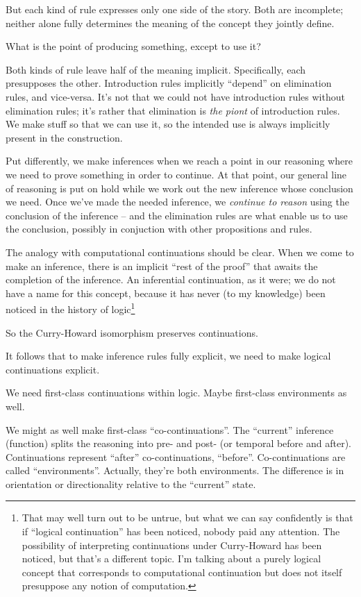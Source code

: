 But each kind of rule expresses only one side of the story. Both are
incomplete; neither alone fully determines the meaning of the concept they
jointly define.

What is the point of producing something, except to use it?

Both kinds of rule leave half of the meaning implicit. Specifically,
each presupposes the other. Introduction rules implicitly ``depend''
on elimination rules, and vice-versa. It's not that we could not have
introduction rules without elimination rules; it's rather that
elimination is \textit{the piont} of introduction rules. We make stuff
so that we can use it, so the intended use is always implicitly
present in the construction.

Put differently, we make inferences when we reach a point in our
reasoning where we need to prove something in order to continue. At
that point, our general line of reasoning is put on hold while we work
out the new inference whose conclusion we need. Once we've made the
needed inference, we \textit{continue to reason} using the conclusion
of the inference -- and the elimination rules are what enable us to
use the conclusion, possibly in conjuction with other propositions and
rules.

The analogy with computational continuations should be clear. When we
come to make an inference, there is an implicit ``rest of the proof''
that awaits the completion of the inference. An inferential
continuation, as it were; we do not have a name for this concept,
because it has never (to my knowledge) been noticed in the history of
logic\footnote{That may well turn out to be untrue, but what we can
say confidently is that if ``logical continuation'' has been noticed,
nobody paid any attention. The possibility of interpreting
continuations under Curry-Howard has been noticed, but that's a
different topic. I'm talking about a purely logical concept that
corresponds to computational continuation but does not itself
presuppose any notion of computation.}

So the Curry-Howard isomorphism preserves continuations.

It follows that to make inference rules fully explicit, we need to make logical continuations explicit.

We need first-class continuations within logic. Maybe first-class
environments as well.

We might as well make first-class ``co-continuations''. The
``current'' inference (function) splits the reasoning into pre- and
post- (or temporal before and after). Continuations represent
``after'' co-continuations, ``before''. Co-continuations are called
``environments''. Actually, they're both environments. The difference
is in orientation or directionality relative to the ``current'' state.

